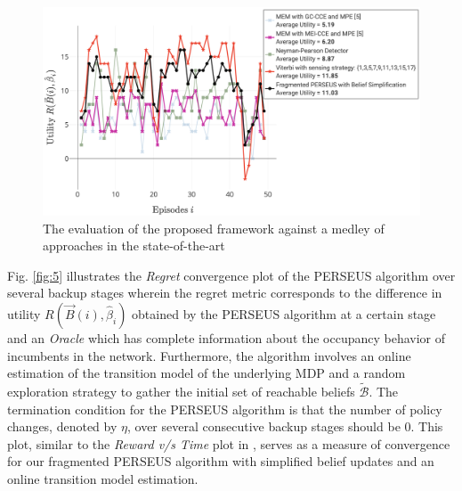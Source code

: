 \documentclass[10pt,twocolumn]{IEEEtran}
\begin{document}
\begin{figure}
    \centering
    \includegraphics[width=1.0\linewidth]{PerformanceEvaluation.png}
    \caption{The evaluation of the proposed framework against a medley of approaches in the state-of-the-art}
    \vspace{-5mm}
    \label{fig:7}
\end{figure}

Fig. \ref{fig:5} illustrates the \emph{Regret} convergence plot of the PERSEUS algorithm over several backup stages wherein the regret metric corresponds to the difference in utility $R(\vec{B}(i), \hat{\beta}_{i})$ obtained by the PERSEUS algorithm at a certain stage and an \emph{Oracle} which has complete information about the occupancy behavior of incumbents in the network. Furthermore, the algorithm involves an online estimation of the transition model of the underlying MDP and a random exploration strategy to gather the initial set of reachable beliefs $\tilde{\mathcal{B}}$. The termination condition for the PERSEUS algorithm is that the number of policy changes, denoted by $\eta$, over several consecutive backup stages should be $0$. This plot, similar to the \emph{Reward v/s Time} plot in \cite{DBLP:journals/corr/abs-1109-2145}, serves as a measure of convergence for our fragmented PERSEUS algorithm with simplified belief updates and an online transition model estimation.
\end{document}

